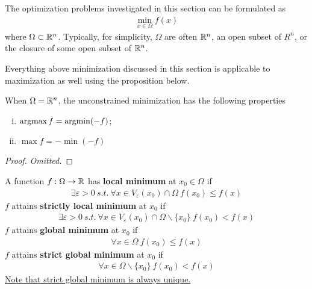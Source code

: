 \documentclass{article}
\begin{document}

    \par The optimization problems investigated in this section can be formulated as
    \begin{align}
    	\min_{x \in \Omega} f(x)
    \end{align}
    where $\Omega \subset \mathbb{R}^n$. Typically, for simplicity, $\Omega$ are often $\mathbb{R}^n$, an open subset of $R^n$, or the closure of some open subset of $\mathbb{R}^n$.
    \par Everything above minimization discussed in this section is applicable to maximization as well using the proposition below.

    \begin{proposition}
        When $\Omega = \mathbb{R}^n$, the unconstrained minimization has the following properties
        \begin{enumerate}[(i)]
            \item $\operatorname*{argmax} f = \operatorname*{argmin} (-f)$;
            \item $\max f = - \min (-f)$
        \end{enumerate}
    \end{proposition}
    
    \begin{proof}
    	\emph{Omitted.}
    \end{proof}
   	
   	\begin{definition}
   		A function $f: \Omega \to \mathbb{R}$ has \textbf{local minimum} at $x_0 \in \Omega$ if
   		\begin{align}
   			\exists \varepsilon > 0\ s.t.\ \forall x \in V_\varepsilon(x_0) \cap \Omega\ f(x_0) \leq f(x)
   		\end{align}
   		$f$ attains \textbf{strictly local minimum} at $x_0$ if
   		\begin{align}
   			\exists \varepsilon > 0\ s.t.\ \forall x \in V_\varepsilon(x_0) \cap \Omega \backslash \{x_0\}\ f(x_0) < f(x)
   		\end{align}
   		$f$ attains \textbf{global minimum} at $x_0$ if
   		\begin{align}
   			\forall x \in \Omega\ f(x_0) \leq f(x)
   		\end{align}
   		$f$ attains \textbf{strict global minimum} at $x_0$ if
   		\begin{align}
   			\forall x \in \Omega \backslash \{x_0\} \ f(x_0) < f(x)
   		\end{align}
   		\ul{Note that strict global minimum is always unique.}
   	\end{definition}
   	
\end{document}
